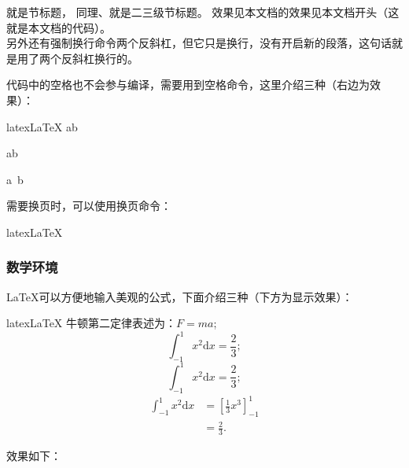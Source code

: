 \code{\section}就是节标题，
同理\code{\subsection}、\code{\subsubsection}就是二三级节标题。
效果见本文档的效果见本文档开头（这就是本文档的代码）。
\\另外还有强制换行命令两个反斜杠\code{\\}，但它只是换行，没有开启新的段落，这句话就是用了两个反斜杠换行的。

代码中的空格也不会参与编译，需要用到空格命令，这里介绍三种（右边为效果）：


\begin{envcode}[listing side text, lefthand ratio=0.48, sidebyside align=top]{latex}{LaTeX}
a\qquad b %

a\quad b  %

a\ b      %
\end{envcode}

需要换页时，可以使用换页命令：

\begin{envcode}{latex}{LaTeX}
\newpage
\end{envcode}


\subsubsection{数学环境}

\LaTeX{}可以方便地输入美观的公式，下面介绍三种（下方为显示效果）：



\begin{envcode}{latex}{LaTeX}
牛顿第二定律表述为：$F=ma$;
\[
\int_{-1}^{1}x^2 \textrm{d}x=\frac{2}{3};
\]
\begin{equation}
    \int_{-1}^{1}x^2 \textrm{d}x=\frac{2}{3};
\end{equation}
\begin{align}
    \int_{-1}^{1}x^2 \textrm{d}x
    &=\left[\frac{1}{3}x^3\right]_{-1}^1\\
    &=\frac{2}{3}.
\end{align}
\end{envcode}
效果如下：

